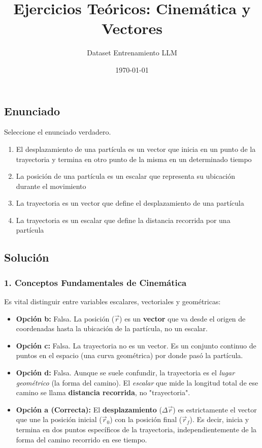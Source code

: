 \documentclass[12pt, a4paper]{article}
\title{Ejercicios Teóricos: Cinemática y Vectores}
\author{Dataset Entrenamiento LLM}
\date{\today}
\begin{document}
\maketitle


\subsection*{Enunciado}
Seleccione el enunciado verdadero.
\begin{enumerate}[label=\alph*)]
    \item El desplazamiento de una partícula es un vector que inicia en un punto de la trayectoria y termina en otro punto de la misma en un determinado tiempo
    \item La posición de una partícula es un escalar que representa su ubicación durante el movimiento
    \item La trayectoria es un vector que define el desplazamiento de una partícula
    \item La trayectoria es un escalar que define la distancia recorrida por una partícula
\end{enumerate}

\subsection*{Solución}

\subsubsection*{1. Conceptos Fundamentales de Cinemática}
Es vital distinguir entre variables escalares, vectoriales y geométricas:
\begin{itemize}
    \item \textbf{Opción b:} Falsa. La posición ($\vec{r}$) es un \textbf{vector} que va desde el origen de coordenadas hasta la ubicación de la partícula, no un escalar.
    \item \textbf{Opción c:} Falsa. La trayectoria no es un vector. Es un conjunto continuo de puntos en el espacio (una curva geométrica) por donde pasó la partícula.
    \item \textbf{Opción d:} Falsa. Aunque se suele confundir, la trayectoria es el \textit{lugar geométrico} (la forma del camino). El \textit{escalar} que mide la longitud total de ese camino se llama \textbf{distancia recorrida}, no "trayectoria".
    \item \textbf{Opción a (Correcta):} El \textbf{desplazamiento} ($\Delta \vec{r}$) es estrictamente el vector que une la posición inicial ($\vec{r}_0$) con la posición final ($\vec{r}_f$). Es decir, inicia y termina en dos puntos específicos de la trayectoria, independientemente de la forma del camino recorrido en ese tiempo.
\end{itemize}
\end{document}
